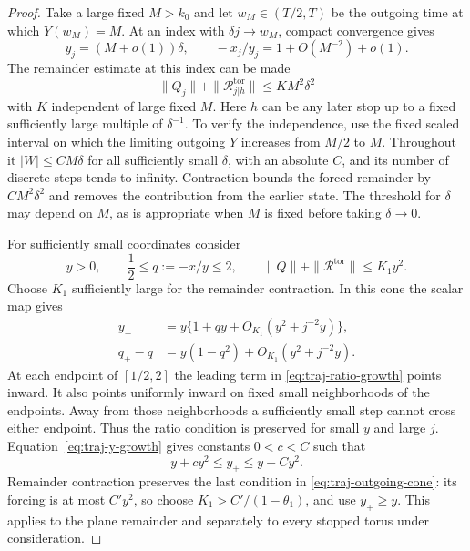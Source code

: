 \begin{proof}
Take a large fixed \(M>k_0\) and let \(w_M\in(T/2,T)\) be the
outgoing time at which \(Y(w_M)=M\).  At an index with
\(\delta j\to w_M\), compact convergence gives
\[
 y_j=(M+o(1))\delta,
 \qquad -x_j/y_j=1+O(M^{-2})+o(1).
\]
The remainder estimate at this index can be made
\begin{equation}\label{eq:traj-cone-initial}
 \|Q_j\|+\|\mathcal R_{j|h}^{\mathrm{tor}}\|
                     \le K M^2\delta^2
\end{equation}
with \(K\) independent of large fixed \(M\).  Here \(h\) can
be any later stop up to a fixed sufficiently large multiple of
\(\delta^{-1}\).  To verify the independence, use the fixed
scaled interval on which the limiting outgoing \(Y\) increases
from \(M/2\) to \(M\).  Throughout it \(|W|\le CM\delta\)
for all sufficiently small \(\delta\), with an absolute \(C\),
and its number of discrete steps tends to infinity.  Contraction
bounds the forced remainder by \(CM^2\delta^2\) and removes
the contribution from the earlier state.  The threshold for
\(\delta\) may depend on \(M\), as is appropriate when \(M\)
is fixed before taking \(\delta\to0\).

For sufficiently small coordinates consider
\begin{equation}\label{eq:traj-outgoing-cone}
 y>0,\qquad \frac12\le q:=-x/y\le2,
 \qquad \|Q\|+\|\mathcal R^{\mathrm{tor}}\|\le K_1y^2.
\end{equation}
Choose \(K_1\) sufficiently large for the remainder contraction.
In this cone the scalar map gives
\begin{align}
 y_+&=y\{1+qy+O_{K_1}(y^2+j^{-2}y)\},
       \label{eq:traj-y-growth}\\
 q_+-q&=y(1-q^2)+O_{K_1}(y^2+j^{-2}y).
       \label{eq:traj-ratio-growth}
\end{align}
At each endpoint of \([1/2,2]\) the leading term in
\eqref{eq:traj-ratio-growth} points inward.  It also points
uniformly inward on fixed small neighborhoods of the endpoints.
Away from those neighborhoods a sufficiently small step cannot
cross either endpoint.  Thus the ratio condition is preserved
for small \(y\) and large \(j\).  Equation~\eqref{eq:traj-y-growth}
gives constants \(0<c<C\) such that
\[
                    y+cy^2\le y_+\le y+Cy^2.
\]
Remainder contraction preserves the last condition in
\eqref{eq:traj-outgoing-cone}: its forcing is at most \(C'y^2\),
so choose \(K_1>C'/(1-\theta_1)\), and use \(y_+\ge y\).
This applies to the plane remainder and separately to every
stopped torus under consideration.


\end{proof}

